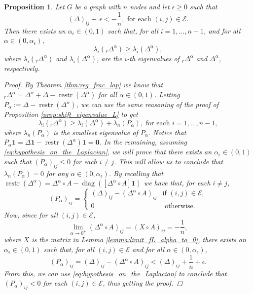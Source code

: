\documentclass[a4paper,12pt]{article}
\newtheorem{proposition}{Proposition}
\DeclareMathOperator{\diag}{diag}
\DeclareMathOperator{\restr}{restr}
\newcommand{\cE}{\mathcal{E}}
\newcommand{\onevec}{\mathbf{1}}
\newcommand{\fL}{\Delta^\alpha}
\newcommand{\rfL}{{}_r\fL}
\begin{document}
\begin{proposition}\label{prop:shift_eigenvalue_fL}
Let $G$ be a graph with $n$ nodes and let $\epsilon\geq0$ such that
\begin{equation} \label{eq:hypothesis_on_the_Laplacian}
    (\Delta)_{ij}  + \,\epsilon< - \frac{1}{n}  , \text{ for each $(i,j)\in\cE$.} 
\end{equation}
Then there exists an $\alpha_\epsilon\in(0,1)$ such that, for all $i=1,\dots,n-1$, and for all $\alpha\in(0,\alpha_{\epsilon})$, 
\begin{equation*}
  \lambda_i(\rfL) \geq \lambda_i(\fL),   
\end{equation*}
where $\lambda_i(\rfL)$ and $\lambda_i(\fL)$, are the $i$-th eigenvalues of $\rfL$ and $\fL$, respectively.
\begin{proof}
By Theorem \ref{thm:reg_frac_lap} we know that $\rfL = \fL + \Delta - \restr(\fL)$ for all $\alpha\in(0,1)$. Letting $P_{\alpha}:=\Delta - \restr(\fL)$, we can use the same reasoning of the proof of Proposition \ref{prop:shift_eigenvalue_L} to get
\begin{equation*}
  \lambda_i(\rfL) \geq \lambda_i(\fL) + \lambda_n(P_{\alpha}), \text{ for each } i=1,\dots,n-1,      
\end{equation*}
where $\lambda_n(P_{\alpha})$ is the smallest eigenvalue of $P_\alpha$. Notice that $P_\alpha\mathbf{1}= \Delta\onevec - \restr(\fL)\onevec =\mathbf{0}$. In the remaining, assuming \eqref{eq:hypothesis_on_the_Laplacian}, we will prove that there exists an $\alpha_{\epsilon}\in(0,1)$ such that $(P_\alpha)_{ij}\leq0$ for each $i\neq j$. This will allow us to conclude that $\lambda_n(P_{\alpha})=0$ for any $\alpha \in (0,\alpha_{\epsilon})$. By recalling that $\restr(\fL) = \fL \circ A - \diag(\left[\fL \circ A\right] \mathbf{1})$ we have that, for each $i\neq j$,
\begin{equation*}
(P_{\alpha})_{ij} =
    \begin{cases}
    (\Delta)_{ij} - (\fL \circ A)_{ij} & \text{if $(i,j)\in\cE$},   \\
    0 & \text{ otherwise.}
    \end{cases}
\end{equation*}
Now, since for all $(i,j)\in \cE$,
\begin{equation*}
    \lim_{\alpha \rightarrow 0^+}  (\fL \circ A)_{ij} =  (X\circ A)_{ij} = - \frac{1}{n},
\end{equation*}
where $X$ is the matrix in Lemma \ref{lemma:limit_fL_alpha_to_0}, there exists an $\alpha_{\epsilon}\in (0,1)$ such that, for all $(i,j)\in\cE$ and for all $\alpha\in(0,\alpha_{\epsilon})$,
\begin{equation*}
  (P_{\alpha})_{ij}=(\Delta)_{ij} -(\fL\circ A)_{ij}  < (\Delta)_{ij} + \frac{1}{n} +  \epsilon.
\end{equation*}
From this, we can use \eqref{eq:hypothesis_on_the_Laplacian} to conclude that $(P_\alpha)_{ij}<0$ for each  $(i,j)\in \cE$, thus getting the proof.
\end{proof}
\end{proposition}
\end{document}

